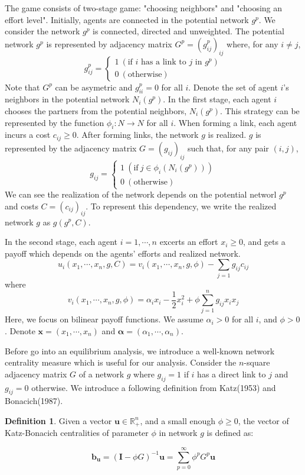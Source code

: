 \documentclass[12pt]{article}
\theoremstyle{definition}
\newtheorem{definition}{Definition}
\newcommand{\bs}[1]{\boldsymbol{#1}}
\begin{document}
The game consists of two-stage game: "choosing neighbors" and "choosing an effort level".
Initially, agents are connected in the potential network $g^p$.
We consider the network $g^p$ is connected, directed and unweighted.
The potential network $g^p$ is represented by adjacency matrix $G^p = {(g_{ij}^p)}_{ij}$ where, for any $i \neq j$,
\[ g_{ij}^p =
	\begin{cases}
		1 \  (\text{if $i$ has a link to $j$ in $g^p $}) \\
		0 \  (\text{otherwise})
	\end{cases} \]
Note that $G^p$ can be asymetric and $g_{ii}^p = 0$ for all $i$.
Denote the set of agent $i$'s neighbors in the potential network $N_i(g^p)$.
In the first stage, each agent $i$ chooses the partners from the potential neighbors, $N_i(g^p)$.
This strategy can be represented by the function $\phi_i : N \rightarrow N$ for all $i$.
When forming a link, each agent incurs a cost $c_{ij} \ge 0$.
After forming links, the network $g$ is realized.
$g$ is represented by the adjacency matrix $G = {(g_{ij})}_{ij}$ such that, for any pair $(i,j)$,
\[ g_{ij} = 
	\begin{cases}
		1 \  (\text{if} \  j \in \phi_i(N_i(g^p)) ) \\
		0 \  (\text{otherwise})
	\end{cases} \]
We can see the realization of the network depends on the potential networl $g^p$ and costs $C = {(c_{ij})}_{ij}$.
To represent this dependency, we write the realized network $g$ as $g(g^p, C)$.

In the second stage, each agent $i = 1, \cdots, n$ excerts an effort $x_i \ge 0$, and gets a payoff which depends on the agents' efforts and realized network.
\[ u_i(x_1, \cdots, x_n, g, C) = v_i(x_1, \cdots, x_n, g, \phi) - \sum_{j=1} g_{ij} c_{ij} \]
where
\[ v_i(x_1, \cdots, x_n, g, \phi) = \alpha_i x_i - \frac{1}{2} x_i^2 + \phi \sum_{j=1}^n g_{ij} x_i x_j \]
Here, we focus on bilinear payoff functions.
We assume $\alpha_i > 0$ for all $i$, and $\phi > 0$.
Denote $\bs{x} = (x_1, \cdots, x_n)$ and $\bs{\alpha} = (\alpha_1, \cdots, \alpha_n)$.

Before go into an equilibrium analysis, we introduce a well-known network centrality measure which is useful for our analysis.
Consider the $n$-square adjacency matrix $G$ of a network $g$ where $g_{ij} = 1$ if $i$ has a direct link to $j$ and $g_{ij} = 0$ otherwise.
We introduce a following definition from Katz(1953) and Bonacich(1987).

\begin{definition}
Given a vector $\bs{u} \in \mathbb{R}_+^n$, and a small enough $\phi \ge 0$, the vector of Katz-Bonacich centralities of parameter $\phi$ in network $g$ is defined as:

\[ \bs{b}_{\bs{u}} = {(\bs{I} - \phi G)}^{-1} \bs{u} = \sum_{p=0}^{\infty} \phi^p G^p \bs{u} \]

\end{definition}
\end{document}
